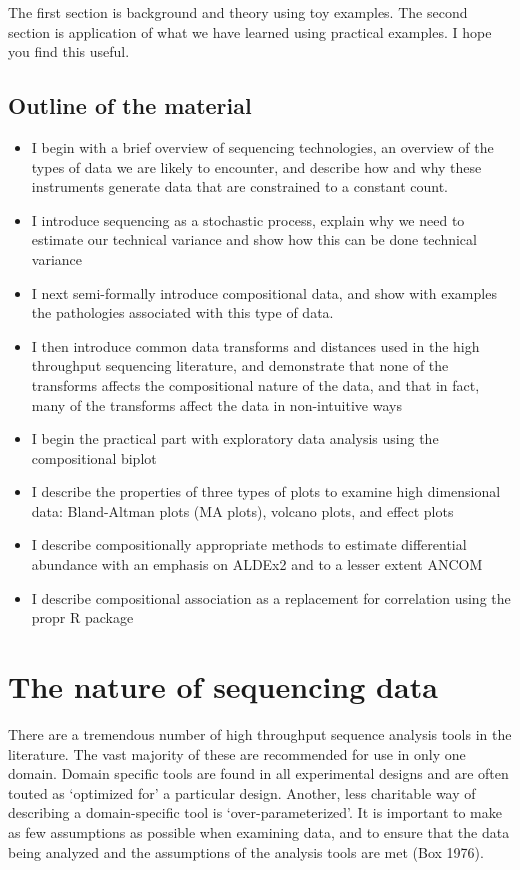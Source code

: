 \documentclass[onecolumn]{article}
\providecommand{\tightlist}{%
  \setlength{\itemsep}{0pt}\setlength{\parskip}{0pt}}
\begin{document}
The first section is background and theory using toy examples. The second section is application of what we have learned using practical examples. I hope you find this useful.

\hypertarget{outline-of-the-material}{%
\subsection{Outline of the material}\label{outline-of-the-material}}

\begin{itemize}
\tightlist
\item
  I begin with a brief overview of sequencing technologies, an overview of the types of data we are likely to encounter, and describe how and why these instruments generate data that are constrained to a constant count.
\item
  I introduce sequencing as a stochastic process, explain why we need to estimate our technical variance and show how this can be done technical variance
\item
  I next semi-formally introduce compositional data, and show with examples the pathologies associated with this type of data.
\item
  I then introduce common data transforms and distances used in the high throughput sequencing literature, and demonstrate that none of the transforms affects the compositional nature of the data, and that in fact, many of the transforms affect the data in non-intuitive ways
\item
  I begin the practical part with exploratory data analysis using the compositional biplot
\item
  I describe the properties of three types of plots to examine high dimensional data: Bland-Altman plots (MA plots), volcano plots, and effect plots
\item
  I describe compositionally appropriate methods to estimate differential abundance with an emphasis on ALDEx2 and to a lesser extent ANCOM
\item
  I describe compositional association as a replacement for correlation using the propr R package
\end{itemize}

\hypertarget{sequencing}{%
\section{The nature of sequencing data}\label{sequencing}}

There are a tremendous number of high throughput sequence analysis tools in the literature. The vast majority of these are recommended for use in only one domain. Domain specific tools are found in all experimental designs and are often touted as `optimized for' a particular design. Another, less charitable way of describing a domain-specific tool is `over-parameterized'. It is important to make as few assumptions as possible when examining data, and to ensure that the data being analyzed and the assumptions of the analysis tools are met (Box 1976).
\end{document}
